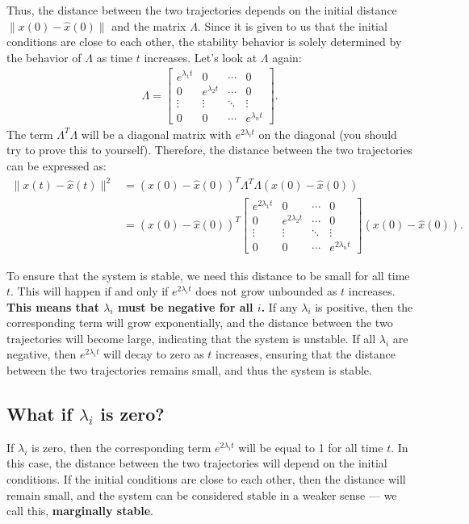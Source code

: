 \documentclass{ee122_notes}
\begin{document}
Thus, the distance between the two trajectories depends on the initial distance $\|x(0) - \hat{x}(0)\|$ and the matrix $\Lambda$. Since it is given to us that the initial conditions are close to each other, the stability behavior is solely determined by the behavior of $\Lambda$ as time $t$ increases. Let's look at $\Lambda$ again:
\begin{align*}
    \Lambda = \begin{bmatrix}
        e^{\lambda_1 t} & 0 & \cdots & 0 \\
        0 & e^{\lambda_2 t} & \cdots & 0 \\
        \vdots & \vdots & \ddots & \vdots \\
        0 & 0 & \cdots & e^{\lambda_n t}
    \end{bmatrix}.
\end{align*}
The term $\Lambda^T \Lambda$ will be a diagonal matrix with $e^{2\lambda_i t}$ on the diagonal (you should try to prove this to yourself). Therefore, the distance between the two trajectories can be expressed as:
\begin{align*}
    \|x(t) - \hat{x}(t)\|^2 &= (x(0) - \hat{x}(0))^T \Lambda^T \Lambda (x(0) - \hat{x}(0)) \\
    &= (x(0) - \hat{x}(0))^T \begin{bmatrix}
        e^{2\lambda_1 t} & 0 & \cdots & 0 \\
        0 & e^{2\lambda_2 t} & \cdots & 0 \\
        \vdots & \vdots & \ddots & \vdots \\
        0 & 0 & \cdots & e^{2\lambda_n t}
    \end{bmatrix} (x(0) - \hat{x}(0)).
\end{align*}

To ensure that the system is stable, we need this distance to be small for all time $t$. This will happen if and only if $e^{2\lambda_i t}$ does not grow unbounded as $t$ increases. \textbf{This means that $\lambda_i$ must be negative for all $i$.} If any $\lambda_i$ is positive, then the corresponding term will grow exponentially, and the distance between the two trajectories will become large, indicating that the system is unstable. If all $\lambda_i$ are negative, then $e^{2\lambda_i t}$ will decay to zero as $t$ increases, ensuring that the distance between the two trajectories remains small, and thus the system is stable.

\subsection{What if $\lambda_i$ is zero?}
If $\lambda_i$ is zero, then the corresponding term $e^{2\lambda_i t}$ will be equal to 1 for all time $t$. In this case, the distance between the two trajectories will depend on the initial conditions. If the initial conditions are close to each other, then the distance will remain small, and the system can be considered stable in a weaker sense --- we call this, \textbf{marginally stable}. 
\end{document}
